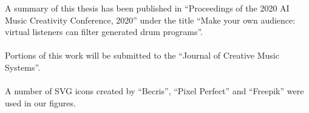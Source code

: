 \documentclass[\main/thesis.tex]{subfiles}
\begin{document}
\begin{acknowledgements} 

A summary of this thesis has been published in \enquote{Proceedings of the 2020 AI Music Creativity Conference, 2020} under the title \enquote{Make your own audience: virtual listeners can filter generated drum programs}.\\\\
Portions of this work will be submitted to the \enquote{Journal of Creative Music Systems}.\\\\
A number of SVG icons created by \enquote{Becris}, \enquote{Pixel Perfect} and \enquote{Freepik} were used in our figures.\\\\ 

\end{acknowledgements}
\end{document}
